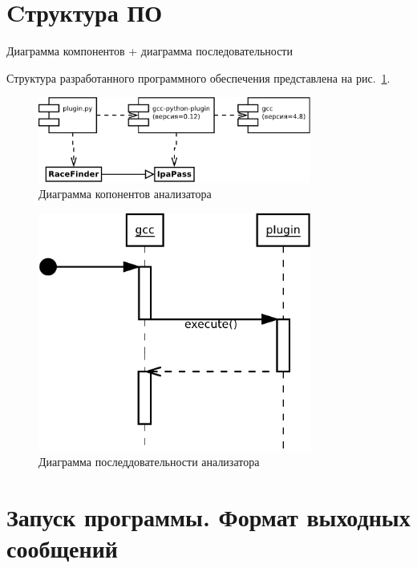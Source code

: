\section{Cтруктура ПО}
Диаграмма компонентов + диаграмма последовательности

Структура разработанного программного обеспечения представлена на рис.~\ref{fig:components}.

\begin{figure}
  \centering
  \includegraphics[width=0.8\textwidth]{inc/dia/components}
  \caption{Диаграмма копонентов анализатора}
  \label{fig:components}
\end{figure}

\begin{figure}
  \centering
  \includegraphics[width=0.8\textwidth]{inc/dia/sequence}
  \caption{Диаграмма последдовательности анализатора}
  \label{fig:sequence}
\end{figure}

\section{Запуск программы. Формат выходных сообщений}

